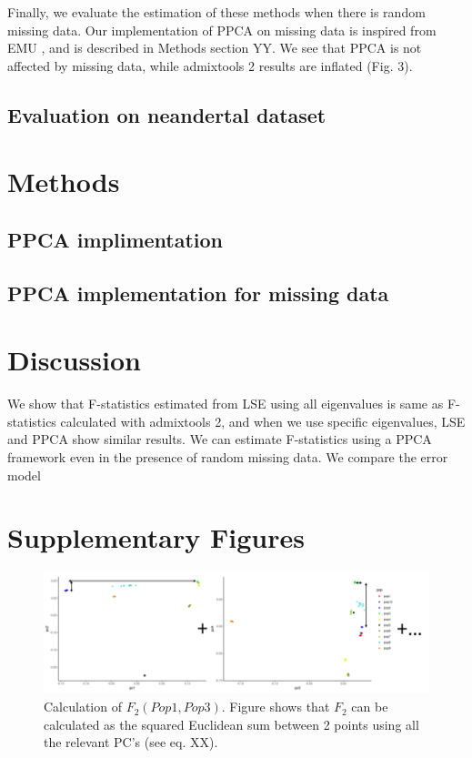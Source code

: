 \documentclass[12pt, letterpaper]{article}
\begin{document}
Finally, we evaluate the estimation of these methods when there is random missing data. Our implementation of PPCA on missing data is inspired from EMU \cite{meisner_large-scale_2021}, and is described in Methods section YY. We see that PPCA is not affected by missing data, while admixtools 2 results are inflated (Fig. 3).

\subsection{Evaluation on neandertal dataset}


\section{Methods}

\subsection{PPCA implimentation}

\subsection{PPCA implementation for missing data}


\section{Discussion}

We show that F-statistics estimated from LSE using all eigenvalues is same as F-statistics calculated with admixtools 2, and when we use specific eigenvalues, LSE and PPCA show similar results. We can estimate F-statistics using a PPCA framework even in the presence of random missing data. We compare the error model 




\section{Supplementary Figures}

\begin{figure}[ht!]
    \includegraphics[width=16.5cm]{inkscape/pca.png}
    \centering
    \caption{Calculation of $F_2(Pop1,Pop3)$. Figure shows that $F_2$ can be calculated as the squared Euclidean sum between 2 points using all the relevant PC's (see eq. XX).}
    \label{figS1:pc_scale}
\end{figure}
\end{document}
